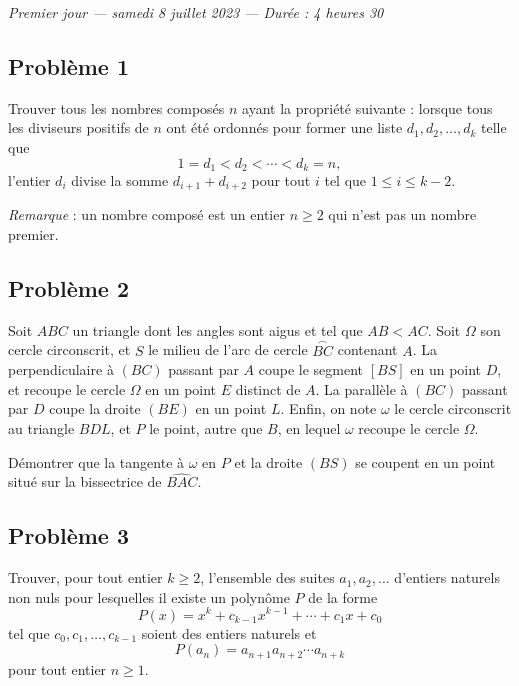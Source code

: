 
\begin{center}
  \emph{Premier jour --- samedi 8 juillet 2023 --- Durée : 4 heures 30}
\end{center}

\subsection*{Problème 1}
Trouver tous les nombres composés $n$ ayant la propriété suivante : lorsque tous les diviseurs positifs de
$n$ ont été ordonnés pour former une liste $d_1, d_2, \ldots, d_k$ telle que
\[
1 = d_1 < d_2 < \cdots < d_k = n,
\]
l'entier $d_i$ divise la somme $d_{i+1} + d_{i+2}$ pour tout $i$ tel que $1 \leqslant i \leqslant k - 2$.

\emph{Remarque} : un nombre composé est un entier $n \geqslant 2$ qui n'est pas un nombre premier.

\subsection*{Problème 2}
Soit $ABC$ un triangle dont les angles sont aigus et tel que $AB < AC$. Soit $\Omega$ son cercle
circonscrit, et $S$ le milieu de l'arc de cercle $\overset{\frown}{BC}$ contenant $A$. La perpendiculaire à
$(BC)$ passant par $A$ coupe le segment $[BS]$ en un point $D$, et recoupe le cercle $\Omega$ en un point
$E$ distinct de $A$. La parallèle à $(BC)$ passant par $D$ coupe la droite $(BE)$ en un point $L$. Enfin,
on note $\omega$ le cercle circonscrit au triangle $BDL$, et $P$ le point, autre que $B$, en lequel
$\omega$ recoupe le cercle $\Omega$.

Démontrer que la tangente à $\omega$ en $P$ et la droite $(BS)$ se coupent en un point situé sur la
bissectrice de $\widehat{BAC}$.

\subsection*{Problème 3}
Trouver, pour tout entier $k \geqslant 2$, l'ensemble des suites $a_1, a_2, \ldots$ d'entiers naturels non
nuls pour lesquelles il existe un polynôme $P$ de la forme
\[
P(x) = x^k + c_{k-1} x^{k-1} + \cdots + c_1 x + c_0
\]
tel que $c_0, c_1, \ldots, c_{k-1}$ soient des entiers naturels et
\[
P(a_n) = a_{n+1} a_{n+2} \cdots a_{n+k}
\]
pour tout entier $n \geqslant 1$.

